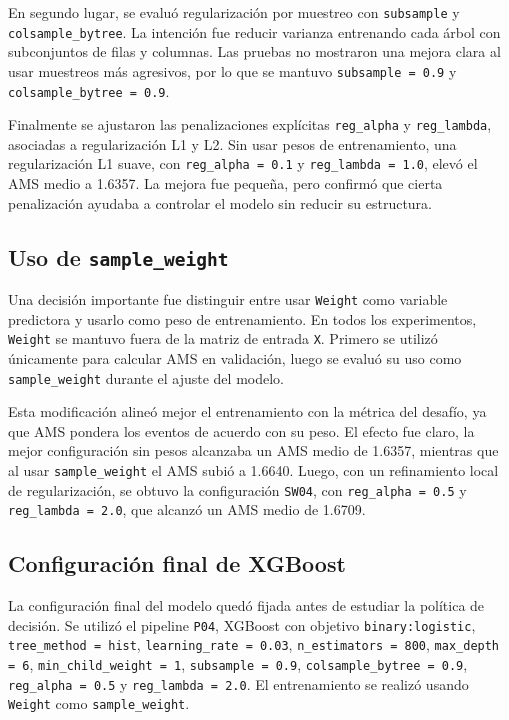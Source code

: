 \documentclass{article}
\begin{document}
En segundo lugar, se evaluó regularización por muestreo con \texttt{subsample} y \texttt{colsample\_bytree}. La intención fue reducir varianza entrenando cada árbol con subconjuntos de filas y columnas. Las pruebas no mostraron una mejora clara al usar muestreos más agresivos, por lo que se mantuvo \texttt{subsample = 0.9} y \texttt{colsample\_bytree = 0.9}.

Finalmente se ajustaron las penalizaciones explícitas \texttt{reg\_alpha} y \texttt{reg\_lambda}, asociadas a regularización L1 y L2. Sin usar pesos de entrenamiento, una regularización L1 suave, con \texttt{reg\_alpha = 0.1} y \texttt{reg\_lambda = 1.0}, elevó el AMS medio a 1.6357. La mejora fue pequeña, pero confirmó que cierta penalización ayudaba a controlar el modelo sin reducir su estructura.

\subsection{Uso de \texttt{sample\_weight}}
Una decisión importante fue distinguir entre usar \texttt{Weight} como variable predictora y usarlo como peso de entrenamiento. En todos los experimentos, \texttt{Weight} se mantuvo fuera de la matriz de entrada \texttt{X}. Primero se utilizó únicamente para calcular AMS en validación, luego se evaluó su uso como \texttt{sample\_weight} durante el ajuste del modelo.

Esta modificación alineó mejor el entrenamiento con la métrica del desafío, ya que AMS pondera los eventos de acuerdo con su peso. El efecto fue claro, la mejor configuración sin pesos alcanzaba un AMS medio de 1.6357, mientras que al usar \texttt{sample\_weight} el AMS subió a 1.6640. Luego, con un refinamiento local de regularización, se obtuvo la configuración \texttt{SW04}, con \texttt{reg\_alpha = 0.5} y \texttt{reg\_lambda = 2.0}, que alcanzó un AMS medio de 1.6709.

\subsection{Configuración final de XGBoost}
La configuración final del modelo quedó fijada antes de estudiar la política de decisión. Se utilizó el pipeline \texttt{P04}, XGBoost con objetivo \texttt{binary:logistic}, \texttt{tree\_method = hist}, \texttt{learning\_rate = 0.03}, \texttt{n\_estimators = 800}, \texttt{max\_depth = 6}, \texttt{min\_child\_weight = 1}, \texttt{subsample = 0.9}, \texttt{colsample\_bytree = 0.9}, \texttt{reg\_alpha = 0.5} y \texttt{reg\_lambda = 2.0}. El entrenamiento se realizó usando \texttt{Weight} como \texttt{sample\_weight}.
\end{document}
